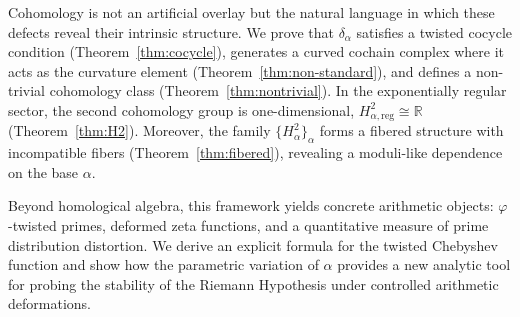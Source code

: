 \documentclass[11pt,a4paper]{article}
\theoremstyle{plain}
\theoremstyle{definition}
\theoremstyle{remark}
\newcommand{\RR}{\mathbb{R}}
\begin{document}
	Cohomology is not an artificial overlay but the natural language in which these defects reveal their intrinsic structure. We prove that $\delta_\alpha$ satisfies a twisted cocycle condition (Theorem~\ref{thm:cocycle}), generates a curved cochain complex where it acts as the curvature element (Theorem~\ref{thm:non-standard}), and defines a non-trivial cohomology class (Theorem~\ref{thm:nontrivial}). In the exponentially regular sector, the second cohomology group is one-dimensional, $H^2_{\alpha,\mathrm{reg}}\cong\RR$ (Theorem~\ref{thm:H2}). Moreover, the family $\{H^2_{\alpha}\}_\alpha$ forms a fibered structure with incompatible fibers (Theorem~\ref{thm:fibered}), revealing a moduli-like dependence on the base $\alpha$.
	
	Beyond homological algebra, this framework yields concrete arithmetic objects: $\varphi$-twisted primes, deformed zeta functions, and a quantitative measure of prime distribution distortion. We derive an explicit formula for the twisted Chebyshev function and show how the parametric variation of $\alpha$ provides a new analytic tool for probing the stability of the Riemann Hypothesis under controlled arithmetic deformations.
	
\end{document}
